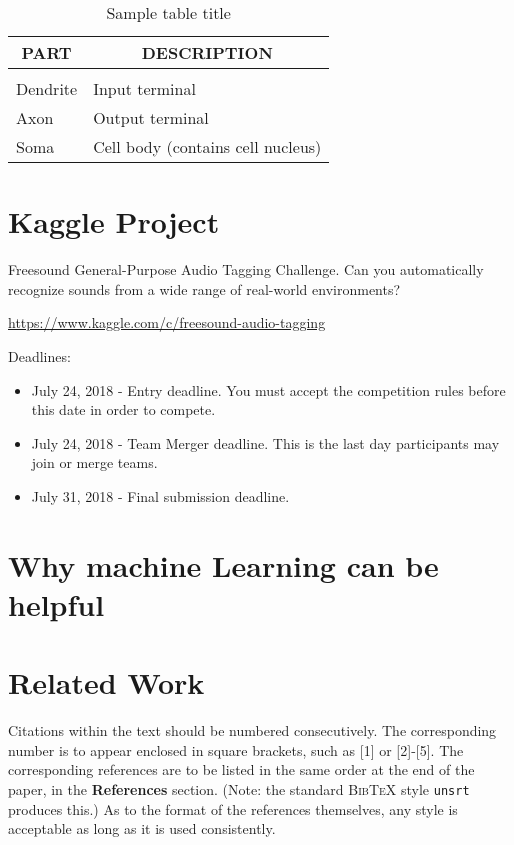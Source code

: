 \documentclass{article} %
\begin{document}
	\begin{table}[t]
	\caption{Sample table title}
	\label{sample-table}
	\begin{center}
	\begin{tabular}{ll}
	\multicolumn{1}{c}{\bf PART}  &\multicolumn{1}{c}{\bf DESCRIPTION}
	\\ \hline \\
	Dendrite         &Input terminal \\
	Axon             &Output terminal \\
	Soma             &Cell body (contains cell nucleus) \\
	\end{tabular}
	\end{center}
	\end{table}

\section{Kaggle Project}

	Freesound General-Purpose Audio Tagging Challenge. Can you automatically recognize sounds from a wide range of real-world environments?
	\begin{center}
	   \url{https://www.kaggle.com/c/freesound-audio-tagging}
	\end{center}
	Deadlines:
	\begin{itemize}
	    \item July 24, 2018 - Entry deadline. You must accept the competition rules before this date in order to compete.
	    \item July 24, 2018 - Team Merger deadline. This is the last day participants may join or merge teams.
	    \item July 31, 2018 - Final submission deadline.
	\end{itemize}

\section{Why machine Learning can be helpful}

\section{Related Work}
	Citations within the text should be numbered consecutively. The corresponding
	number is to appear enclosed in square brackets, such as [1] or [2]-[5]. The
	corresponding references are to be listed in the same order at the end of the
	paper, in the \textbf{References} section. (Note: the standard
	\textsc{Bib\TeX} style \texttt{unsrt} produces this.) As to the format of the
	references themselves, any style is acceptable as long as it is used
	consistently.
\end{document}
